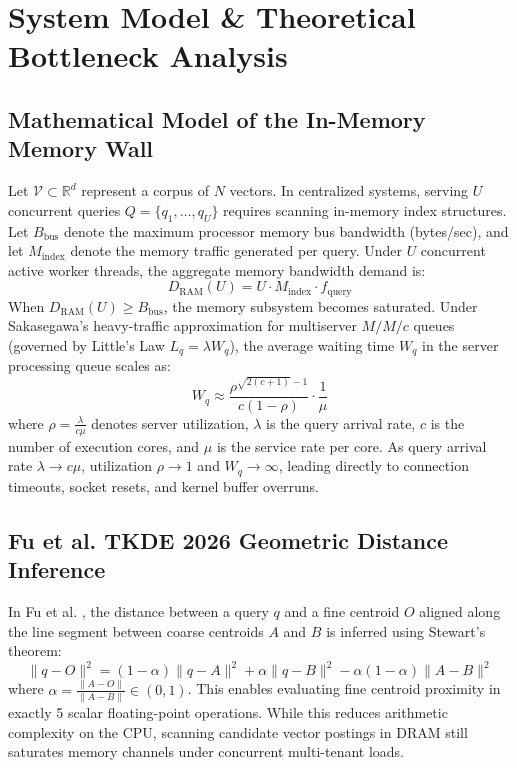 \documentclass[11pt,journal,compsoc,onecolumn]{IEEEtran}
\begin{document}
\section{System Model \& Theoretical Bottleneck Analysis}

\subsection{Mathematical Model of the In-Memory Memory Wall}
Let $\mathcal{V} \subset \mathbb{R}^d$ represent a corpus of $N$ vectors. In centralized systems, serving $U$ concurrent queries $Q = \{q_1, \dots, q_U\}$ requires scanning in-memory index structures.
Let $B_{\text{bus}}$ denote the maximum processor memory bus bandwidth (bytes/sec), and let $M_{\text{index}}$ denote the memory traffic generated per query. Under $U$ concurrent active worker threads, the aggregate memory bandwidth demand is:
\begin{equation}
    D_{\text{RAM}}(U) = U \cdot M_{\text{index}} \cdot f_{\text{query}}
\end{equation}
When $D_{\text{RAM}}(U) \ge B_{\text{bus}}$, the memory subsystem becomes saturated. Under Sakasegawa's heavy-traffic approximation \cite{sakasegawa1977numerical} for multiserver $M/M/c$ queues (governed by Little's Law $L_q = \lambda W_q$), the average waiting time $W_q$ in the server processing queue scales as:
\begin{equation}
    W_q \approx \frac{\rho^{\sqrt{2(c+1)}-1}}{c(1 - \rho)} \cdot \frac{1}{\mu}
\end{equation}
where $\rho = \frac{\lambda}{c \mu}$ denotes server utilization, $\lambda$ is the query arrival rate, $c$ is the number of execution cores, and $\mu$ is the service rate per core. As query arrival rate $\lambda \to c\mu$, utilization $\rho \to 1$ and $W_q \to \infty$, leading directly to connection timeouts, socket resets, and kernel buffer overruns.

\subsection{Fu et al. TKDE 2026 Geometric Distance Inference}
In Fu et al. \cite{fu2026geometric}, the distance between a query $q$ and a fine centroid $O$ aligned along the line segment between coarse centroids $A$ and $B$ is inferred using Stewart's theorem:
\begin{equation}
    \|q - O\|^2 = (1 - \alpha)\|q - A\|^2 + \alpha\|q - B\|^2 - \alpha(1 - \alpha)\|A - B\|^2
\end{equation}
where $\alpha = \frac{\|A - O\|}{\|A - B\|} \in (0, 1)$. This enables evaluating fine centroid proximity in exactly 5 scalar floating-point operations. While this reduces arithmetic complexity on the CPU, scanning candidate vector postings in DRAM still saturates memory channels under concurrent multi-tenant loads.
\end{document}

